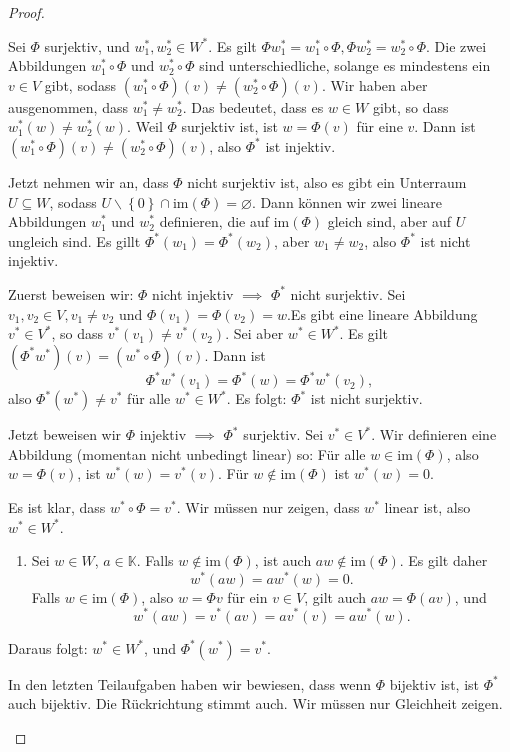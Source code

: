 \begin{proof}
	\begin{parts}
	\item Sei $\Phi$ surjektiv, und $w_1^*,w_2^*\in W^*$. Es gilt $\Phi w_1^*=w_1^*\circ \Phi, \Phi w_2^*=w_2^*\circ \Phi$. Die zwei Abbildungen  $w_1^*\circ \Phi$ und $w_2^*\circ \Phi$ sind unterschiedliche, solange es mindestens ein $v\in V$ gibt, sodass $(w_1^*\circ\Phi)(v)\neq (w_2^*\circ\Phi)(v)$. Wir haben aber ausgenommen, dass $w_1^*\neq w_2^*$. Das bedeutet, dass es $w\in W$ gibt, so dass $w_1^*(w)\neq w_2^*(w)$. Weil $\Phi$ surjektiv ist, ist $w=\Phi(v)$ f\"{u}r eine $v$. Dann ist $(w_1^*\circ\Phi)(v)\neq (w_2^*\circ\Phi)(v)$, also  $\Phi^*$ ist injektiv.

		Jetzt nehmen wir an, dass $\Phi$ nicht surjektiv ist, also es gibt ein Unterraum $U\subseteq W$, sodass $U\backslash \left\{ 0 \right\} \cap \text{im}(\Phi)=\varnothing$. Dann können wir zwei lineare Abbildungen $w_1^*$ und $w_2^*$ definieren, die auf $\text{im}(\Phi)$ gleich sind, aber auf $U$ ungleich sind. Es gillt $\Phi^*(w_1)=\Phi^*(w_2)$, aber $w_1\neq w_2$, also $\Phi^*$ ist nicht injektiv. 
	\item Zuerst beweisen wir: $\Phi$ nicht injektiv $\implies$ $\Phi^*$ nicht surjektiv.
		Sei $v_1,v_2\in V,v_1\neq v_2$ und $\Phi(v_1)=\Phi(v_2)=w$.Es gibt eine lineare Abbildung $v^*\in V^*$, so dass $v^*(v_1)\neq v^*(v_2)$. Sei aber $w^*\in W^*$. Es gilt $\left( \Phi^* w^* \right)(v) =(w^*\circ\Phi)(v)$. Dann ist
		\[
		\Phi^*w^*(v_1)=\Phi^*(w)=\Phi^*w^*(v_2)
		,\] 
		also $\Phi^*(w^*)\neq v^*$ f\"{u}r alle $w^*\in W^*$. Es folgt: $\Phi^*$ ist nicht surjektiv.

		Jetzt beweisen wir $\Phi$ injektiv $\implies$ $\Phi^*$ surjektiv. Sei $v^*\in V^*$. Wir definieren eine Abbildung (momentan nicht unbedingt linear) so: F\"{u}r alle  $w\in \text{im}(\Phi)$, also  $w=\Phi(v)$, ist $w^*(w)=v^*(v)$. F\"{u}r  $w\not\in \text{im}(\Phi)$ ist $w^*(w)=0$. 

		Es ist klar, dass $w^*\circ \Phi=v^*$. Wir müssen nur zeigen, dass $w^*$ linear ist, also $w^*\in W^*$.
		 \begin{enumerate}[label=(\arabic*)]
			 \item Sei $w\in W$, $a\in \mathbb{K}$. Falls $w \not\in \text{im}(\Phi)$, ist auch $aw\not\in \text{im}(\Phi)$. Es gilt daher
				 \[
				 w^*(aw)=aw^*(w)=0
				 .\] 
				 Falls $w\in \text{im}(\Phi)$, also $w=\Phi v$ f\"{u}r ein $v\in V$, gilt auch $aw=\Phi(av)$, und
				 \[
				 w^*(aw)=v^*(av)=av^*(v)=aw^*(w)
				 .\] 
		\end{enumerate}
		Daraus folgt: $w^*\in W^*$, und $\Phi^*(w^*)=v^*$.
	\item In den letzten Teilaufgaben haben wir bewiesen, dass wenn $\Phi$ bijektiv ist, ist $\Phi^*$ auch bijektiv. Die Rückrichtung stimmt auch. Wir müssen nur Gleichheit zeigen.


\end{parts}
\end{proof}
